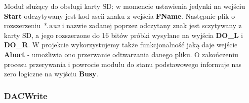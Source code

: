 \documentclass{article}
\begin{document}
\begin{figure}[H]
    \centering
\end{figure}

Moduł służący do obsługi karty SD; w momencie ustawienia jedynki na wejściu \textbf{Start} odczytywany jest kod ascii znaku z wejścia \textbf{FName}. Następnie plik o rozszerzeniu \textit{*.wav} i nazwie zadanej poprzez odczytany znak jest sczytywany z karty SD, a jego rozszerzone do 16 bitów próbki wysyłane na wyjścia \textbf{DO\_L} i \textbf{DO\_R}.
W projekcie wykorzystujemy także funkcjonalność jaką daje wejście \textbf{Abort} - umożliwia ono przerwanie odtwarzania danego pliku. O zakończeniu procesu przerywania i powrocie modułu do stanu podstawowego informuje nas zero logiczne na wyjściu \textbf{Busy}.

\subsubsection{DACWrite}
\end{document}
